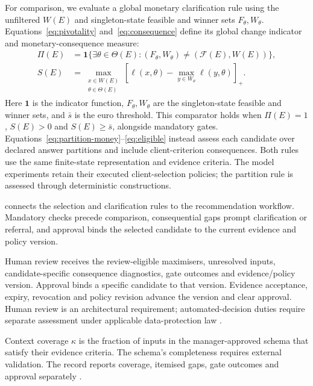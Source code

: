 \documentclass[oneside,10pt,english]{swissi}
\begin{document}
For comparison, we evaluate a global monetary clarification rule using the unfiltered $W(E)$ and singleton-state feasible and winner sets $F_\theta,W_\theta$. Equations~\eqref{eq:pivotality} and~\eqref{eq:consequence} define its global change indicator and monetary-consequence measure:
\begin{align}
 \Pi(E)&=\mathbf 1\{\exists\theta\in\Theta(E):(F_\theta,W_\theta)\ne(\mathcal F(E),W(E))\},\label{eq:pivotality}\\
 S(E)&=\max_{\substack{x\in W(E)\\\theta\in\Theta(E)}}
 \left[\ell(x,\theta)-\max_{y\in W_\theta}\ell(y,\theta)\right]_+.
 \label{eq:consequence}
\end{align}
Here $\mathbf 1$ is the indicator function, $F_\theta,W_\theta$ are the singleton-state feasible and winner sets, and $\bar s$ is the euro threshold. This comparator holds when $\Pi(E)=1$, $S(E)>0$ and $S(E)\ge\bar s$, alongside mandatory gates. Equations~\eqref{eq:partition-money}--\eqref{eq:eligible} instead assess each candidate over declared answer partitions and include client-criterion consequences. Both rules use the same finite-state representation and evidence criteria. The model experiments retain their executed client-selection policies; the partition rule is assessed through deterministic constructions.

 connects the selection and clarification rules to the recommendation workflow. Mandatory checks precede comparison, consequential gaps prompt clarification or referral, and approval binds the selected candidate to the current evidence and policy version.



Human review receives the review-eligible maximisers, unresolved inputs, candidate-specific consequence diagnostics, gate outcomes and evidence/policy version. Approval binds a specific candidate to that version. Evidence acceptance, expiry, revocation and policy revision advance the version and clear approval. Human review is an architectural requirement; automated-decision duties require separate assessment under applicable data-protection law \parencites[art.~22]{europeanunion2016gdpr}{fdpic2026information}.

Context coverage $\kappa$ is the fraction of inputs in the manager-approved schema that satisfy their evidence criteria. The schema's completeness requires external validation. The record reports coverage, itemised gaps, gate outcomes and approval separately \parencite{kurz2026identity}.
\end{document}
